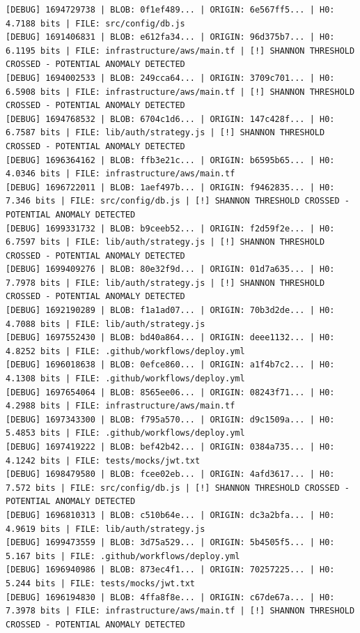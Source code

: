 \documentclass[12pt, a4paper, oneside]{report}
\begin{document}
\begin{lstlisting}[basicstyle=\tiny\ttfamily]
[DEBUG] 1694729738 | BLOB: 0f1ef489... | ORIGIN: 6e567ff5... | H0: 4.7188 bits | FILE: src/config/db.js
[DEBUG] 1691406831 | BLOB: e612fa34... | ORIGIN: 96d375b7... | H0: 6.1195 bits | FILE: infrastructure/aws/main.tf | [!] SHANNON THRESHOLD CROSSED - POTENTIAL ANOMALY DETECTED
[DEBUG] 1694002533 | BLOB: 249cca64... | ORIGIN: 3709c701... | H0: 6.5908 bits | FILE: infrastructure/aws/main.tf | [!] SHANNON THRESHOLD CROSSED - POTENTIAL ANOMALY DETECTED
[DEBUG] 1694768532 | BLOB: 6704c1d6... | ORIGIN: 147c428f... | H0: 6.7587 bits | FILE: lib/auth/strategy.js | [!] SHANNON THRESHOLD CROSSED - POTENTIAL ANOMALY DETECTED
[DEBUG] 1696364162 | BLOB: ffb3e21c... | ORIGIN: b6595b65... | H0: 4.0346 bits | FILE: infrastructure/aws/main.tf
[DEBUG] 1696722011 | BLOB: 1aef497b... | ORIGIN: f9462835... | H0: 7.346 bits | FILE: src/config/db.js | [!] SHANNON THRESHOLD CROSSED - POTENTIAL ANOMALY DETECTED
[DEBUG] 1699331732 | BLOB: b9ceeb52... | ORIGIN: f2d59f2e... | H0: 6.7597 bits | FILE: lib/auth/strategy.js | [!] SHANNON THRESHOLD CROSSED - POTENTIAL ANOMALY DETECTED
[DEBUG] 1699409276 | BLOB: 80e32f9d... | ORIGIN: 01d7a635... | H0: 7.7978 bits | FILE: lib/auth/strategy.js | [!] SHANNON THRESHOLD CROSSED - POTENTIAL ANOMALY DETECTED
[DEBUG] 1692190289 | BLOB: f1a1ad07... | ORIGIN: 70b3d2de... | H0: 4.7088 bits | FILE: lib/auth/strategy.js
[DEBUG] 1697552430 | BLOB: bd40a864... | ORIGIN: deee1132... | H0: 4.8252 bits | FILE: .github/workflows/deploy.yml
[DEBUG] 1696018638 | BLOB: 0efce860... | ORIGIN: a1f4b7c2... | H0: 4.1308 bits | FILE: .github/workflows/deploy.yml
[DEBUG] 1697654064 | BLOB: 8565ee06... | ORIGIN: 08243f71... | H0: 4.2988 bits | FILE: infrastructure/aws/main.tf
[DEBUG] 1697343300 | BLOB: f795a570... | ORIGIN: d9c1509a... | H0: 5.4853 bits | FILE: .github/workflows/deploy.yml
[DEBUG] 1697419222 | BLOB: bef42b42... | ORIGIN: 0384a735... | H0: 4.1242 bits | FILE: tests/mocks/jwt.txt
[DEBUG] 1698479580 | BLOB: fcee02eb... | ORIGIN: 4afd3617... | H0: 7.572 bits | FILE: src/config/db.js | [!] SHANNON THRESHOLD CROSSED - POTENTIAL ANOMALY DETECTED
[DEBUG] 1696810313 | BLOB: c510b64e... | ORIGIN: dc3a2bfa... | H0: 4.9619 bits | FILE: lib/auth/strategy.js
[DEBUG] 1699473559 | BLOB: 3d75a529... | ORIGIN: 5b4505f5... | H0: 5.167 bits | FILE: .github/workflows/deploy.yml
[DEBUG] 1696940986 | BLOB: 873ec4f1... | ORIGIN: 70257225... | H0: 5.244 bits | FILE: tests/mocks/jwt.txt
[DEBUG] 1696194830 | BLOB: 4ffa8f8e... | ORIGIN: c67de67a... | H0: 7.3978 bits | FILE: infrastructure/aws/main.tf | [!] SHANNON THRESHOLD CROSSED - POTENTIAL ANOMALY DETECTED

\end{lstlisting}
\end{document}
